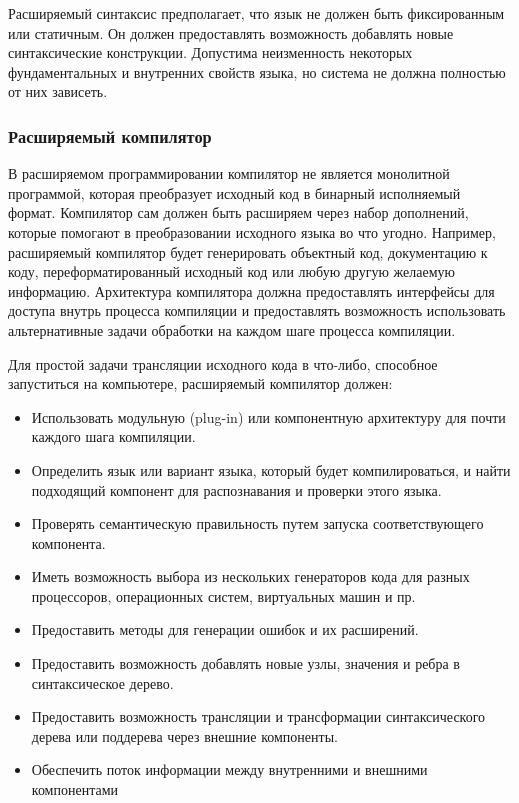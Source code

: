 \documentclass[a4paper,12pt,titlepage]{extarticle}
\begin{document}
Расширяемый синтаксис предполагает, что язык не должен быть фиксированным
или статичным. Он должен предоставлять возможность добавлять новые синтаксические конструкции.
Допустима неизменность некоторых фундаментальных и внутренних свойств языка, но
система не должна полностью от них зависеть.

\subsubsection*{Расширяемый компилятор}

В расширяемом программировании компилятор не является монолитной программой,
которая преобразует исходный код в бинарный исполняемый формат. Компилятор сам
должен быть расширяем через набор дополнений, которые помогают в преобразовании
исходного языка во что угодно. Например, расширяемый компилятор будет
генерировать объектный код, документацию к коду, переформатированный исходный
код или любую другую желаемую информацию. Архитектура компилятора должна
предоставлять интерфейсы для доступа внутрь процесса компиляции и предоставлять
возможность использовать альтернативные задачи обработки на каждом шаге
процесса компиляции.

Для простой задачи трансляции исходного кода в что-либо, способное запуститься
на компьютере, расширяемый компилятор должен:

\begin{itemize}
  \item Использовать модульную (plug-in) или компонентную архитектуру для почти
  каждого шага компиляции.
  \item Определить язык или вариант языка, который будет компилироваться, и
  найти подходящий компонент для распознавания и проверки этого языка.
  \item Проверять семантическую правильность путем запуска соответствующего
  компонента.
  \item Иметь возможность выбора из нескольких генераторов кода для разных
  процессоров, операционных систем, виртуальных машин и пр.
  \item Предоставить методы для генерации ошибок и их расширений.
  \item Предоставить возможность добавлять новые узлы, значения и ребра в
  синтаксическое дерево.
  \item Предоставить возможность трансляции и трансформации синтаксического
  дерева или поддерева через внешние компоненты.
  \item Обеспечить поток информации между внутренними и внешними компонентами
\end{itemize}
\end{document}
